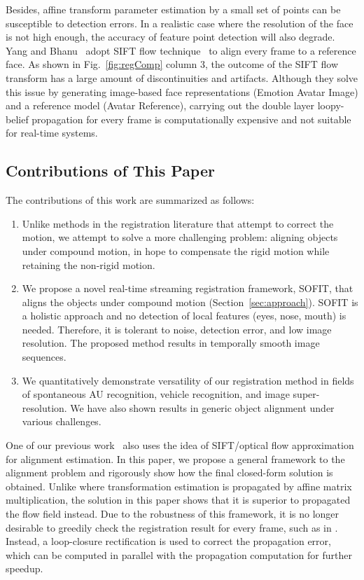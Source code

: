 \documentclass[10pt,journal]{IEEEtran}
\begin{document}
Besides, affine transform parameter estimation by a small set of points can be susceptible to detection errors. In a realistic case where the resolution of the face is not high enough, the accuracy of feature point detection will also degrade. Yang and Bhanu~\cite{Yang_SMCB12} adopt SIFT flow technique~\cite{Liu_PAMI11} to align every frame to a reference face. As shown in Fig.~\ref{fig:regComp} column 3, the outcome of the SIFT flow transform has a large amount of discontinuities and artifacts. Although they solve this issue by generating image-based face representations (Emotion Avatar Image) and a reference model (Avatar Reference), carrying out the double layer loopy-belief propagation for every frame is computationally expensive and not suitable for real-time systems.

\subsection{\label{sec:contribution}Contributions of This Paper}

The contributions of this work are summarized as follows:

\begin{enumerate}
\item Unlike methods in the registration literature that attempt to correct the motion, we attempt to solve a more challenging problem: aligning objects under compound motion, in hope to compensate the rigid motion while retaining the non-rigid motion.
\item We propose a novel real-time streaming registration framework, SOFIT, that aligns the objects under compound motion (Section~\ref{sec:approach}). SOFIT is a holistic approach and no detection of local features (eyes, nose, mouth) is needed. Therefore, it is tolerant to noise, detection error, and low image resolution. The proposed method results in temporally smooth image sequences.
\item We quantitatively demonstrate versatility of our registration method in fields of spontaneous AU recognition, vehicle recognition, and image super-resolution. We have also shown results in generic object alignment under various challenges.
\end{enumerate}

One of our previous work~\cite{Yang_FG13} also uses the idea of SIFT/optical flow approximation for alignment estimation. In this paper, we propose a general framework to the alignment problem and rigorously show how the final closed-form solution is obtained. Unlike \cite{Yang_FG13} where transformation estimation is propagated by affine matrix multiplication, the solution in this paper shows that it is superior to propagated the flow field instead. Due to the robustness of this framework, it is no longer desirable to greedily check the registration result for every frame, such as in \cite{Yang_FG13}. Instead, a loop-closure rectification is used to correct the propagation error, which can be computed in parallel with the propagation computation for further speedup. 
\end{document}
